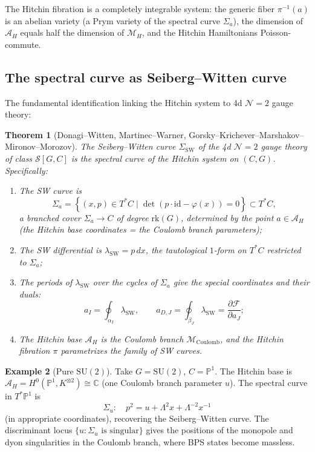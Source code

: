 \documentclass[11pt]{article}
\newtheorem{theorem}{Theorem}[section]
\theoremstyle{definition}
\newtheorem{example}[theorem]{Example}
\theoremstyle{remark}
\newcommand{\cA}{\mathcal{A}}
\newcommand{\cF}{\mathcal{F}}
\newcommand{\cM}{\mathcal{M}}
\newcommand{\cN}{\mathcal{N}}
\newcommand{\id}{\mathrm{id}}
\newcommand{\SW}{\mathrm{SW}}
\newcommand{\SU}{\mathrm{SU}}
\newcommand{\Coulomb}{\mathrm{Coulomb}}
\begin{document}
The Hitchin fibration is a completely integrable system: the generic fiber $\pi^{-1}(a)$ is an
abelian variety (a Prym variety of the spectral curve $\Sigma_a$), the dimension of $\cA_H$ equals
half the dimension of $\cM_H$, and the Hitchin Hamiltonians Poisson-commute.

\subsection{The spectral curve as Seiberg--Witten curve}
\label{subsec:spectral-sw}

The fundamental identification linking the Hitchin system to 4d $\cN=2$ gauge theory:

\begin{theorem}[Donagi--Witten, Martinec--Warner, Gorsky--Krichever--Marshakov--Mironov--Morozov]
 \label{thm:sw-hitchin}
 The Seiberg--Witten curve $\Sigma_{\SW}$ of the 4d $\cN=2$ gauge theory of class $\mathcal{S}[G, C]$
 is the spectral curve of the Hitchin system on $(C, G)$. Specifically:
 \begin{enumerate}[label=(\roman*),nosep]
 \item The SW curve is
 \begin{equation}
 \label{eq:spectral-curve}
 \Sigma_a = \left\{ (x, p) \in T^*C \;\Big|\; \det(p \cdot \id - \varphi(x)) = 0 \right\}
 \subset T^*C,
 \end{equation}
 a branched cover $\Sigma_a \to C$ of degree $\mathrm{rk}(G)$, determined by the point
 $a \in \cA_H$ (the Hitchin base coordinates = the Coulomb branch parameters);
 \item The SW differential is $\lambda_{\SW} = p \, dx$, the tautological $1$-form on $T^*C$
 restricted to $\Sigma_a$;
 \item The periods of $\lambda_{\SW}$ over the cycles of $\Sigma_a$ give the special coordinates
 and their duals:
 \begin{equation}
 \label{eq:sw-periods}
 a_I = \oint_{\alpha_I} \lambda_{\SW}, \qquad a_{D,J} = \oint_{\beta_J} \lambda_{\SW} = \frac{\partial \cF}{\partial a_J};
 \end{equation}
 \item The Hitchin base $\cA_H$ is the Coulomb branch $\cM_{\Coulomb}$, and the Hitchin
 fibration $\pi$ parametrizes the family of SW curves.
 \end{enumerate}
\end{theorem}

\begin{example}[Pure $\SU(2)$]
 \label{ex:pure-su2}
 Take $G = \SU(2)$, $C = \mathbb{P}^1$. The Hitchin base is $\cA_H = H^0(\mathbb{P}^1, K^{\otimes 2})
 \cong \mathbb{C}$ (one Coulomb branch parameter $u$). The spectral curve in $T^*\mathbb{P}^1$ is
 \begin{equation}
 \label{eq:sw-curve-su2}
 \Sigma_u \colon \quad p^2 = u + \Lambda^2 x + \Lambda^{-2} x^{-1}
 \end{equation}
 (in appropriate coordinates), recovering the Seiberg--Witten curve. The discriminant locus
 $\{u : \Sigma_u \text{ is singular}\}$ gives the positions of the monopole and dyon singularities
 in the Coulomb branch, where BPS states become massless.
\end{example}
\end{document}
